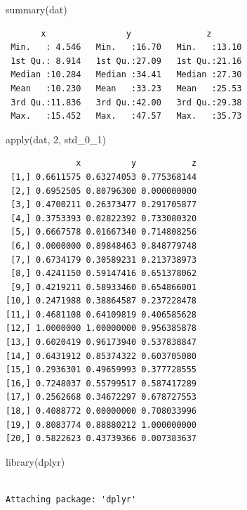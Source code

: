 \documentclass[
  letterpaper,
  DIV=11,
  numbers=noendperiod]{scrreprt}
\newenvironment{Shaded}{\begin{snugshade}}{\end{snugshade}}
\newcommand{\DecValTok}[1]{\textcolor[rgb]{0.68,0.00,0.00}{#1}}
\newcommand{\FunctionTok}[1]{\textcolor[rgb]{0.28,0.35,0.67}{#1}}
\newcommand{\NormalTok}[1]{\textcolor[rgb]{0.00,0.23,0.31}{#1}}
\begin{document}
\begin{Shaded}
\begin{Highlighting}[]
\FunctionTok{summary}\NormalTok{(dat)}
\end{Highlighting}
\end{Shaded}

\begin{verbatim}
       x                y               z        
 Min.   : 4.546   Min.   :16.70   Min.   :13.10  
 1st Qu.: 8.914   1st Qu.:27.09   1st Qu.:21.16  
 Median :10.284   Median :34.41   Median :27.30  
 Mean   :10.230   Mean   :33.23   Mean   :25.53  
 3rd Qu.:11.836   3rd Qu.:42.00   3rd Qu.:29.38  
 Max.   :15.452   Max.   :47.57   Max.   :35.73  
\end{verbatim}

\begin{Shaded}
\begin{Highlighting}[]
\FunctionTok{apply}\NormalTok{(dat, }\DecValTok{2}\NormalTok{, std\_0\_1)}
\end{Highlighting}
\end{Shaded}

\begin{verbatim}
              x          y           z
 [1,] 0.6611575 0.63274053 0.775368144
 [2,] 0.6952505 0.80796300 0.000000000
 [3,] 0.4700211 0.26373477 0.291705877
 [4,] 0.3753393 0.02822392 0.733080320
 [5,] 0.6667578 0.01667340 0.714808256
 [6,] 0.0000000 0.89848463 0.848779748
 [7,] 0.6734179 0.30589231 0.213738973
 [8,] 0.4241150 0.59147416 0.651378062
 [9,] 0.4219211 0.58933460 0.654866001
[10,] 0.2471988 0.38864587 0.237228478
[11,] 0.4681108 0.64109819 0.406585628
[12,] 1.0000000 1.00000000 0.956385878
[13,] 0.6020419 0.96173940 0.537838847
[14,] 0.6431912 0.85374322 0.603705080
[15,] 0.2936301 0.49659993 0.377728555
[16,] 0.7248037 0.55799517 0.587417289
[17,] 0.2562668 0.34672297 0.678727553
[18,] 0.4088772 0.00000000 0.708033996
[19,] 0.8083774 0.88880212 1.000000000
[20,] 0.5822623 0.43739366 0.007383637
\end{verbatim}

\begin{Shaded}
\begin{Highlighting}[]
\FunctionTok{library}\NormalTok{(dplyr)}
\end{Highlighting}
\end{Shaded}

\begin{verbatim}

Attaching package: 'dplyr'
\end{verbatim}
\end{document}
